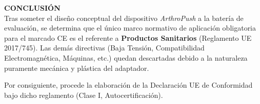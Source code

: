 \documentclass[11pt,a4paper]{article}
\begin{document}
\noindent
\begin{minipage}{\textwidth}
    \textbf{\color{ArthroNavy}\large CONCLUSIÓN} \\
    
    \noindent Tras someter el diseño conceptual del dispositivo \textit{ArthroPush} a la batería de evaluación, se determina que el único marco normativo de aplicación obligatoria para el marcado CE es el referente a \textbf{Productos Sanitarios} (Reglamento UE 2017/745). Las demás directivas (Baja Tensión, Compatibilidad Electromagnética, Máquinas, etc.) quedan descartadas debido a la naturaleza puramente mecánica y plástica del adaptador. 
    
    \vspace{0.2cm}
    \noindent Por consiguiente, procede la elaboración de la Declaración UE de Conformidad bajo dicho reglamento (Clase I, Autocertificación).
\end{minipage}
\end{document}
